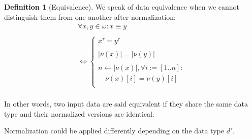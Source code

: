 \documentclass[twoside,twocolumn]{article}
\theoremstyle{definition}
\newtheorem{definition}{Definition}
\theoremstyle{remark}
\begin{document}
\begin{definition}[Equivalence]
    \label{equivalence}
    We speak of data equivalence when we cannot distinguish them from one another after normalization:
    \begin{equation}
        \label{eq:equivalence}
        \begin{array}{l}
            \forall x, y \in \omega: x \equiv y \\ \\
            \iff \left\{
                \begin{array}{l}
                    x^\tau = y^\tau \\ \\
                    |\nu(x)| = |\nu(y)| \\ \\
                    n \gets |\nu(x)|, \forall i := [1..n]: \\
                        \quad \nu(x)[i] = \nu(y)[i] \\
                \end{array}
            \right. \\
            \end{array}
    \end{equation}

    In other words, two input data are said equivalent if they share the same data type and their normalized versions are identical.
\end{definition}

Normalization could be applied differently depending on the data type $d^\tau$.
\end{document}
